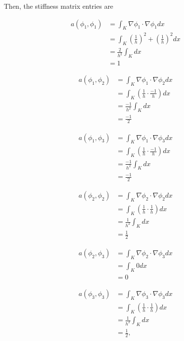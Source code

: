 \documentclass{hw-template}
\begin{document}
Then, the stiffness matrix entries are 

\begin{align}
    a(\phi_1, \phi_1) &= \int_K \nabla \phi_1 \cdot \nabla\phi_1 dx\\
                      &= \int_K  \left(\frac{1}{h} \right)^2 + \left(\frac{1}{h} \right)^2dx\\
                      &= \frac{2}{h^2} \int_K dx\\
                      &=1
\end{align}

\begin{align}
    a(\phi_1, \phi_2) &= \int_K \nabla \phi_1 \cdot \nabla\phi_2 dx\\
                      &= \int_K  \left(\frac{1}{h} \cdot \frac{-1}{h} \right) dx\\
                      &= \frac{-1}{h^2} \int_K dx\\
                      &= \frac{-1}{2}
\end{align}

\begin{align}
    a(\phi_1, \phi_3) &= \int_K \nabla \phi_1 \cdot \nabla\phi_3 dx\\
                      &= \int_K  \left(\frac{1}{h} \cdot \frac{-1}{h} \right) dx\\
                      &= \frac{-1}{h^2} \int_K dx\\
                      &= \frac{-1}{2}
\end{align}

\begin{align}
    a(\phi_2, \phi_2) &= \int_K \nabla \phi_2 \cdot \nabla\phi_2 dx\\
                      &= \int_K  \left(\frac{1}{h} \cdot \frac{1}{h} \right) dx\\
                      &= \frac{1}{h^2} \int_K dx\\
                      &= \frac{1}{2}
\end{align}

\begin{align}
    a(\phi_2, \phi_3) &= \int_K \nabla \phi_2 \cdot \nabla\phi_3 dx\\
                      &= \int_K  0 dx\\
                      &= 0
\end{align}

\begin{align}
    a(\phi_3, \phi_3) &= \int_K \nabla \phi_3 \cdot \nabla\phi_3 dx\\
                      &= \int_K  \left(\frac{1}{h} \cdot \frac{1}{h} \right) dx\\
                      &= \frac{1}{h^2} \int_K dx\\
                      &= \frac{1}{2},
\end{align}
\end{document}
